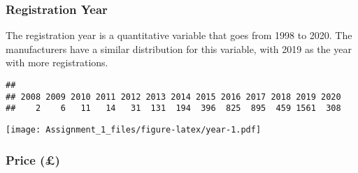 \documentclass[
]{article}
\newenvironment{Shaded}{\begin{snugshade}}{\end{snugshade}}
\newcommand{\AttributeTok}[1]{\textcolor[rgb]{0.77,0.63,0.00}{#1}}
\newcommand{\CommentTok}[1]{\textcolor[rgb]{0.56,0.35,0.01}{\textit{#1}}}
\newcommand{\DecValTok}[1]{\textcolor[rgb]{0.00,0.00,0.81}{#1}}
\newcommand{\FunctionTok}[1]{\textcolor[rgb]{0.00,0.00,0.00}{#1}}
\newcommand{\NormalTok}[1]{#1}
\newcommand{\SpecialCharTok}[1]{\textcolor[rgb]{0.00,0.00,0.00}{#1}}
\newcommand{\StringTok}[1]{\textcolor[rgb]{0.31,0.60,0.02}{#1}}
\begin{document}
\newpage

\hypertarget{registration-year}{%
\subsubsection{Registration Year}\label{registration-year}}

The registration year is a quantitative variable that goes from 1998 to
2020. The manufacturers have a similar distribution for this variable,
with 2019 as the year with more registrations.

\begin{Shaded}
\end{Shaded}

\begin{verbatim}
## 
## 2008 2009 2010 2011 2012 2013 2014 2015 2016 2017 2018 2019 2020 
##    2    6   11   14   31  131  194  396  825  895  459 1561  308
\end{verbatim}

\begin{Shaded}
\end{Shaded}

\texttt{[image: Assignment\_1\_files/figure-latex/year-1.pdf]}

\newpage

\hypertarget{price}{%
\subsubsection{Price (£)}\label{price}}
\end{document}
